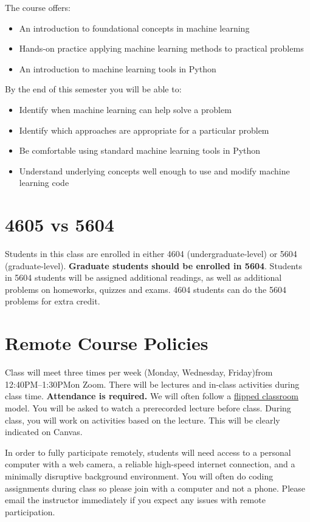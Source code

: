 \documentclass[10pt]{memoir}
\def\mymeetingdays{Monday, Wednesday, Friday}
\def\mymeetingtimes{12:40PM--1:30PM}
\begin{document}
The course offers:

\begin{itemize}
\item An introduction to foundational concepts in machine learning
\item Hands-on practice applying machine learning methods to practical problems
\item An introduction to machine learning tools in Python 
\end{itemize}

By the end of this semester you will be able to:
\begin{itemize}
\item Identify when machine learning can help solve a problem
\item Identify which approaches are appropriate for a particular problem
\item Be comfortable using standard machine learning tools in Python
\item Understand underlying concepts well enough to use and modify machine learning code
\end{itemize}

\section{\textbf{4605 vs 5604}}

Students in this class are enrolled in either 4604 (undergraduate-level) or 5604 (graduate-level). \textbf{Graduate students should be enrolled in 5604}. Students in 5604 students will be assigned additional readings, as well as additional problems on homeworks, quizzes and exams. 4604 students can do the 5604 problems for extra credit.

\section{\textbf{Remote Course Policies}}
Class will meet three times per week (\mymeetingdays)\space from \mymeetingtimes\space on Zoom. There will be lectures and in-class activities during class time. \textbf{Attendance is required.} We will often follow a \href{https://en.wikipedia.org/wiki/Flipped_classroom}{flipped classroom} model. You will be asked to watch a prerecorded lecture before class. During class, you will work on activities based on the lecture. This will be clearly indicated on Canvas.
 
In order to fully participate remotely, students will need access to a personal computer with a web camera, a reliable high-speed internet connection, and a minimally disruptive background environment. {You will often do coding assignments during class so please join with a computer and not a phone}. Please email the instructor immediately if you expect any issues with remote participation.
\end{document}
